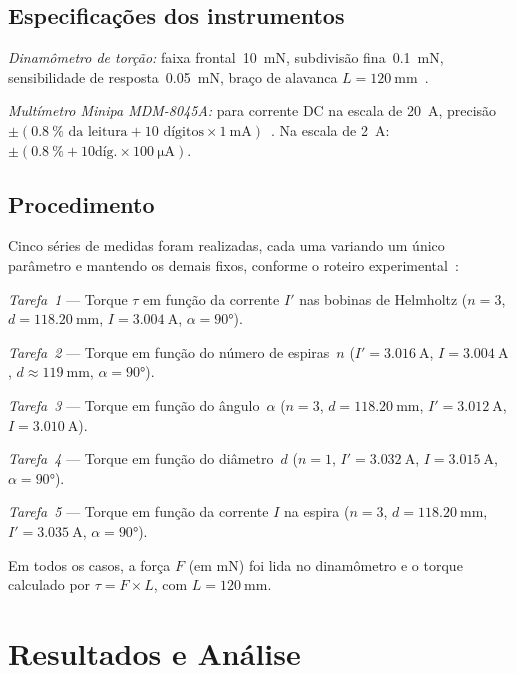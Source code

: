 \documentclass[aps, twocolumn, superscriptaddress, floatfix, nofootinbib]{revtex4-2}
\begin{document}
\subsection{Especificações dos instrumentos}

\textit{Dinamômetro de torção:} faixa frontal~\SI{10}{\milli\newton},
subdivisão fina~\SI{0,1}{\milli\newton}, sensibilidade de
resposta~\SI{0,05}{\milli\newton}, braço de alavanca $L =
\SI{120}{\milli\metre}$~\cite{PHYWE}.

\textit{Multímetro Minipa MDM-8045A:} para corrente DC na escala de
\SI{20}{\ampere}, precisão $\pm(\SI{0,8}{\percent}\text{ da leitura} +
10\text{ dígitos}\times\SI{1}{\milli\ampere})$~\cite{MDM8045A}. Na escala de
\SI{2}{\ampere}: $\pm(\SI{0,8}{\percent} + 10\text{
díg.}\times\SI{100}{\micro\ampere})$.

\subsection{Procedimento}

Cinco séries de medidas foram realizadas, cada uma variando um único parâmetro
e mantendo os demais fixos, conforme o roteiro experimental~\cite{Roteiro}:

\textit{Tarefa~1} --- Torque $\tau$ em função da corrente $I'$ nas bobinas de
Helmholtz ($n=3$, $d=\SI{118,20}{\milli\metre}$, $I=\SI{3,004}{\ampere}$,
$\alpha=\ang{90}$).

\textit{Tarefa~2} --- Torque em função do número de espiras~$n$ ($I'=
\SI{3,016}{\ampere}$, $I=\SI{3,004}{\ampere}$, $d\approx
\SI{119}{\milli\metre}$, $\alpha=\ang{90}$).

\textit{Tarefa~3} --- Torque em função do ângulo~$\alpha$ ($n=3$, $d=
\SI{118,20}{\milli\metre}$, $I'=\SI{3,012}{\ampere}$,
$I=\SI{3,010}{\ampere}$).

\textit{Tarefa~4} --- Torque em função do diâmetro~$d$ ($n=1$,
$I'=\SI{3,032}{\ampere}$, $I=\SI{3,015}{\ampere}$, $\alpha=\ang{90}$).

\textit{Tarefa~5} --- Torque em função da corrente $I$ na espira ($n=3$, $d=
\SI{118,20}{\milli\metre}$, $I'=\SI{3,035}{\ampere}$, $\alpha=\ang{90}$).

Em todos os casos, a força $F$ (em \si{\milli\newton}) foi lida no dinamômetro
e o torque calculado por $\tau = F\times L$, com $L=\SI{120}{\milli\metre}$.


\section{Resultados e Análise}\label{sec:resultados}
\end{document}
